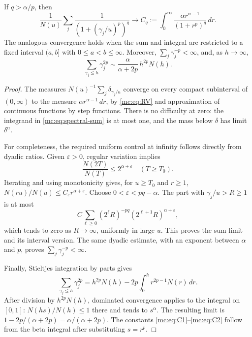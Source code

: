 \begin{lemma}\label{mc:lem:sums}
If $q>\alpha/p$, then
\begin{equation}\label{mc:eq:spectral-sum}
 \frac1{N(u)}\sum_j\frac1{(1+(\gamma_j/u)^p)^q}
 \longrightarrow
 C_q:=\int_0^\infty\frac{\alpha r^{\alpha-1}}{(1+r^p)^q}\,dr.
\end{equation}
The analogous convergence holds when the sum and integral are restricted
to a fixed interval $(a,b]$ with $0\leq a<b\leq\infty$.
Moreover, $\sum_j\gamma_j^{-p}<\infty$, and, as $h\longrightarrow\infty$,
\begin{equation}\label{mc:eq:power-sum}
 \sum_{\gamma_j\leq h}\gamma_j^{2p}
 \sim\frac{\alpha}{\alpha+2p}\,h^{2p}N(h).
\end{equation}
\end{lemma}

\begin{proof}
The measures $N(u)^{-1}\sum_j\delta_{\gamma_j/u}$ converge on every
compact subinterval of $(0,\infty)$ to the measure
$\alpha r^{\alpha-1}\,dr$, by \eqref{mc:eq:RV} and approximation of
continuous functions by step functions.  There is no difficulty at zero:
the integrand in \eqref{mc:eq:spectral-sum} is at most one, and the mass
below $\delta$ has limit $\delta^\alpha$.

For completeness, the required uniform control at infinity follows
directly from dyadic ratios.  Given $\varepsilon>0$, regular variation
implies
\[
 \frac{N(2T)}{N(T)}\leq2^{\alpha+\varepsilon}
 \quad(T\geq T_0).
\]
Iterating and using monotonicity gives, for $u\geq T_0$ and $r\geq1$,
$N(ru)/N(u)\leq C_\varepsilon r^{\alpha+\varepsilon}$.
Choose $0<\varepsilon<pq-\alpha$.  The part with $\gamma_j/u>R\geq1$
is at most
\[
 C\sum_{\ell\geq0}(2^\ell R)^{-pq}
                  (2^{\ell+1}R)^{\alpha+\varepsilon},
\]
which tends to zero as $R\to\infty$, uniformly in large $u$.
This proves the sum limit and its interval version.  The same dyadic
estimate, with an exponent between $\alpha$ and $p$, proves
$\sum_j\gamma_j^{-p}<\infty$.

Finally, Stieltjes integration by parts gives
\[
 \sum_{\gamma_j\leq h}\gamma_j^{2p}
 =h^{2p}N(h)-2p\int_0^h r^{2p-1}N(r)\,dr.
\]
After division by $h^{2p}N(h)$, dominated convergence applies to the
integral on $[0,1]$: $N(hs)/N(h)\leq1$ there and tends to $s^\alpha$.
The resulting limit is
$1-2p/(\alpha+2p)=\alpha/(\alpha+2p)$.
The constants \eqref{mc:eq:C1}--\eqref{mc:eq:C2} follow from the beta
integral after substituting $s=r^p$.
\end{proof}

